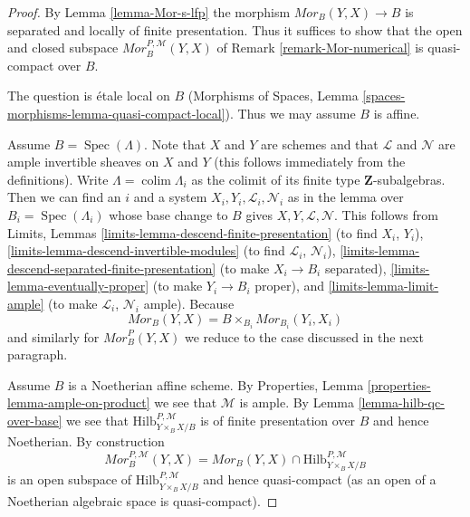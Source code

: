 \documentclass[10pt,a4paper]{amsart}
\theoremstyle{plain}
\theoremstyle{definition}
\theoremstyle{remark}
\numberwithin{equation}{subsection}
\def\colim{\mathop{\mathrm{colim}}\nolimits}
\def\Spec{\mathop{\mathrm{Spec}}}
\def\Hilbfunctor{\mathrm{Hilb}}
\begin{document}
\begin{proof}
By Lemma \ref{lemma-Mor-s-lfp} the morphism $\mathit{Mor}_B(Y, X) \to B$
is separated and locally of finite presentation. Thus it suffices to
show that the open and closed subspace $\mathit{Mor}^{P, \mathcal{M}}_B(Y, X)$
of Remark \ref{remark-Mor-numerical} is quasi-compact over $B$.

\medskip\noindent
The question is \'etale local on $B$
(Morphisms of Spaces, Lemma \ref{spaces-morphisms-lemma-quasi-compact-local}).
Thus we may assume $B$ is affine.

\medskip\noindent
Assume $B = \Spec(\Lambda)$. Note that $X$ and
$Y$ are schemes and that $\mathcal{L}$ and $\mathcal{N}$ are ample
invertible sheaves on $X$ and $Y$ (this follows immediately from the
definitions). Write $\Lambda = \colim \Lambda_i$ as the
colimit of its finite type $\mathbf{Z}$-subalgebras. Then
we can find an $i$ and a system $X_i, Y_i, \mathcal{L}_i, \mathcal{N}_i$
as in the lemma over $B_i = \Spec(\Lambda_i)$ whose base change to
$B$ gives $X, Y, \mathcal{L}, \mathcal{N}$. This follows from
Limits, Lemmas
\ref{limits-lemma-descend-finite-presentation} (to find $X_i$, $Y_i$),
\ref{limits-lemma-descend-invertible-modules} (to find $\mathcal{L}_i$,
$\mathcal{N}_i$), \ref{limits-lemma-descend-separated-finite-presentation}
(to make $X_i \to B_i$ separated), \ref{limits-lemma-eventually-proper}
(to make $Y_i \to B_i$ proper), and \ref{limits-lemma-limit-ample}
(to make $\mathcal{L}_i$, $\mathcal{N}_i$ ample).
Because
$$
\mathit{Mor}_B(Y, X) = B \times_{B_i} \mathit{Mor}_{B_i}(Y_i, X_i)
$$
and similarly for $\mathit{Mor}^P_B(Y, X)$ we reduce
to the case discussed in the next paragraph.

\medskip\noindent
Assume $B$ is a Noetherian affine scheme. By
Properties, Lemma \ref{properties-lemma-ample-on-product}
we see that $\mathcal{M}$ is ample. By Lemma \ref{lemma-hilb-qc-over-base}
we see that $\Hilbfunctor^{P, \mathcal{M}}_{Y \times_B X/B}$ is of
finite presentation over $B$ and hence Noetherian.
By construction
$$
\mathit{Mor}^{P, \mathcal{M}}_B(Y, X) =
\mathit{Mor}_B(Y, X) \cap
\Hilbfunctor^{P, \mathcal{M}}_{Y \times_B X/B}
$$
is an open subspace of $\Hilbfunctor^{P, \mathcal{M}}_{Y \times_B X/B}$ and
hence quasi-compact (as an open of a Noetherian algebraic space
is quasi-compact).
\end{proof}
\end{document}
